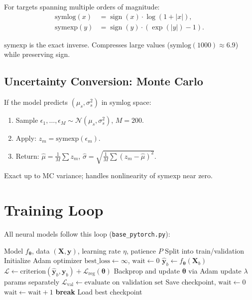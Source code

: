 \documentclass[11pt,a4paper]{article}
\theoremstyle{definition}
\newcommand{\by}{\mathbf{y}}
\newcommand{\bX}{\mathbf{X}}
\newcommand{\btheta}{\boldsymbol{\theta}}
\DeclareMathOperator{\sign}{sign}
\begin{document}
For targets spanning multiple orders of magnitude:
\begin{align}
  \mathrm{symlog}(x) &= \sign(x) \cdot \log(1 + |x|), \label{eq:symlog} \\
  \mathrm{symexp}(y) &= \sign(y) \cdot (\exp(|y|) - 1). \label{eq:symexp}
\end{align}

$\mathrm{symexp}$ is the exact inverse. Compresses large values
($\mathrm{symlog}(1000) \approx 6.9$) while preserving sign.

\subsection{Uncertainty Conversion: Monte Carlo}

If the model predicts $(\mu_s, \sigma_s^2)$ in symlog space:
\begin{enumerate}[nosep]
  \item Sample $\epsilon_1, \ldots, \epsilon_M \sim \mathcal{N}(\mu_s, \sigma_s^2)$, $M = 200$.
  \item Apply: $z_m = \mathrm{symexp}(\epsilon_m)$.
  \item Return: $\hat{\mu} = \frac{1}{M}\sum z_m$, $\hat{\sigma} = \sqrt{\frac{1}{M}\sum(z_m - \hat{\mu})^2}$.
\end{enumerate}

Exact up to MC variance; handles nonlinearity of symexp near zero.

\section{Training Loop}
\label{sec:training}

All neural models follow this loop (\texttt{base\_pytorch.py}):

\begin{algorithm}[H]
\caption{Training loop for PyTorch models}
\begin{algorithmic}[1]
\Require Model $f_\btheta$, data $(\bX, \by)$, learning rate $\eta$, patience $P$
\State Split into train/validation
\State Initialize Adam optimizer
\State $\text{best\_loss} \gets \infty$, $\text{wait} \gets 0$
  \For{each mini-batch $(\bX_b, \by_b)$}
    \State $\hat{\by}_b \gets f_\btheta(\bX_b)$
    \State $\mathcal{L} \gets \text{criterion}(\hat{\by}_b, \by_b) + \mathcal{L}_{\mathrm{reg}}(\btheta)$
    \State Backprop and update $\btheta$ via Adam
     update $\lambda$ params separately \EndIf
  \EndFor
  \State $\mathcal{L}_{\mathrm{val}} \gets \text{evaluate on validation set}$
    \State Save checkpoint, $\text{wait} \gets 0$
  \Else
    \State $\text{wait} \gets \text{wait} + 1$
     \textbf{break} \EndIf
  \EndIf
\EndFor
\State Load best checkpoint
\end{algorithmic}
\end{algorithm}
\end{document}
